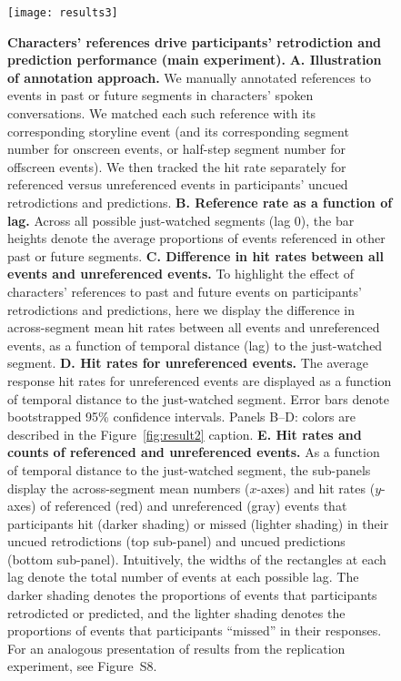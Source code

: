 \documentclass[10pt]{article}
\newcommand{\refEffectRep}{S8}
\begin{document}
\begin{figure}[tp]
  \centering
  \texttt{[image: results3]}

  \caption{\textbf{Characters' references drive participants' retrodiction and prediction performance (main experiment).} \textbf{A. Illustration of annotation approach.} We manually annotated references to events in past or future segments in characters' spoken conversations. We matched each such reference with its corresponding storyline event (and its corresponding segment number for onscreen events, or half-step segment number for offscreen events). We then tracked the hit rate separately for referenced versus unreferenced events in participants' uncued retrodictions and predictions. \textbf{B. Reference rate as a function of lag.} Across all possible just-watched segments (lag 0), the bar heights denote the average proportions of events referenced in other past or future segments. \textbf{C. Difference in hit rates between all events and unreferenced events.} To highlight the effect of characters' references to past and future events on participants' retrodictions and predictions, here we display the difference in across-segment mean hit rates between all events and unreferenced events, as a function of temporal distance (lag) to the just-watched segment. \textbf{D. Hit rates for unreferenced events.} The average response hit rates for unreferenced events are displayed as a function of temporal distance to the just-watched segment. Error bars denote bootstrapped 95\% confidence intervals. Panels B--D: colors are described in the Figure~\ref{fig:result2} caption. \textbf{E. Hit rates and counts of referenced and unreferenced events.} As a function of temporal distance to the just-watched segment, the sub-panels display the across-segment mean numbers ($x$-axes) and hit rates ($y$-axes) of referenced (red) and unreferenced (gray) events that participants hit (darker shading) or missed (lighter shading) in their uncued retrodictions (top sub-panel) and uncued predictions (bottom sub-panel). Intuitively, the widths of the rectangles at each lag denote the total number of events at each possible lag. The darker shading denotes the proportions of events that participants retrodicted or predicted, and the lighter shading denotes the proportions of events that participants ``missed'' in their responses. For an analogous presentation of results from the replication experiment, see Figure~\refEffectRep.}

  \label{fig:result3}
\end{figure}
\end{document}
